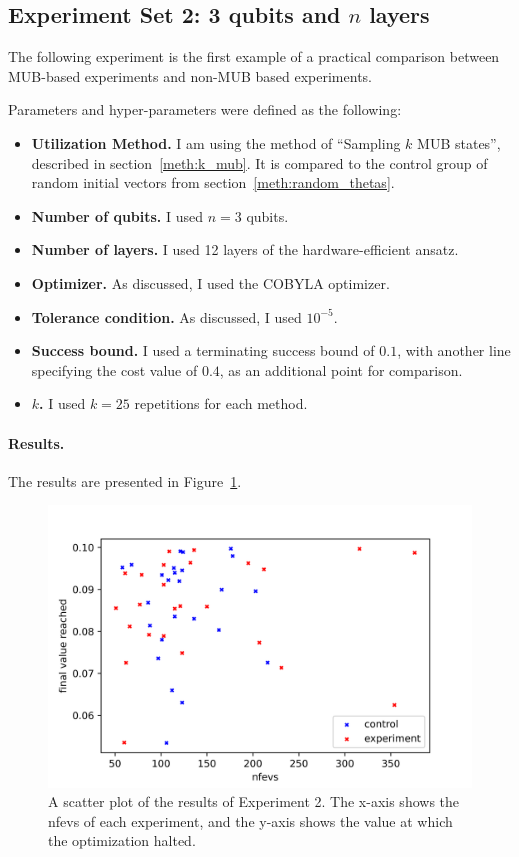 \documentclass[a4paper,12pt]{article}
\newcommand{\e}[1]{ 10^{#1}}
\newenvironment{denseitemize}%
  {\begin{itemize}%
    \setlength{\itemsep}{0pt}}%
  {\end{itemize}}
\begin{document}
\subsection{Experiment Set 2: 3 qubits and $n$ layers} \label{subsec:3qubits}
The following experiment is the first example of a practical comparison between MUB-based experiments and non-MUB based experiments.

Parameters and hyper-parameters were defined as the following:
\begin{denseitemize}
    \item \textbf{Utilization Method.} I am using the method of ``Sampling $k$ MUB states'', described in section~\ref{meth:k_mub}. It is compared to the control group of random initial vectors from section~\ref{meth:random_thetas}.
    \item \textbf{Number of qubits.} I used $n=3$ qubits.
    \item \textbf{Number of layers.} I used 12 layers of the hardware-efficient ansatz.
    \item \textbf{Optimizer.} As discussed, I used the COBYLA optimizer.
    \item \textbf{Tolerance condition.} As discussed, I used $\e{-5}$.
    \item \textbf{Success bound.} I used a terminating success bound of $0.1$, with another line specifying the cost value of $0.4$, as an additional point for comparison.
    \item \textbf{$k$.} I used $k=25$ repetitions for each method.
\end{denseitemize}

\paragraph*{Results.}
The results are presented in Figure~\ref{fig:3qubits}.

\begin{figure}[]
    \centering
    \captionsetup{justification=centering, margin=1cm}
    \includegraphics[scale=0.8]{3qubits.png}
    \caption{A scatter plot of the results of Experiment 2. The x-axis shows the nfevs of each experiment, and the y-axis shows the value at which the optimization halted.}
    \label{fig:3qubits}
\end{figure}
\end{document}
